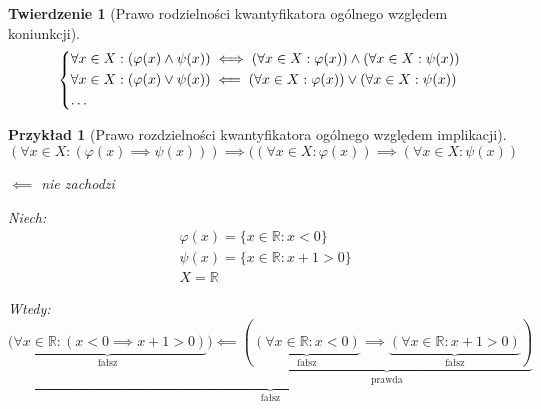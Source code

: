 \documentclass[a5paper,8pt]{article}
\theoremstyle{mythmstyle}
\newtheorem{theorem}{Twierdzenie}[section]
\newtheorem*{example}{Przykład}
\begin{document}
            \begin{theorem}[Prawo rodzielności kwantyfikatora ogólnego względem koniunkcji]

                \[
                    \begin{dcases*}
                    \forall x \in X : (\varphi(x) \wedge \psi(x)) \iff (\forall x \in X : \varphi(x)) \wedge (\forall x \in X : \psi(x)) \\
                    \forall x \in X : (\varphi(x) \vee \psi(x)) \impliedby (\forall x \in X : \varphi(x)) \vee (\forall x \in X : \psi(x)) \\
                    \ldots
                    \end{dcases*}
                \]

            \end{theorem}

            \begin{example}[Prawo rozdzielności kwantyfikatora ogólnego względem implikacji]
                \begin{equation*}
                    (\forall x \in X : ( \varphi(x) \implies \psi(x))) \implies ((\forall x \in X : \varphi(x)) \implies (\forall x \in X : \psi(x))
                \end{equation*}

                \begin{center}
                    $ \impliedby $ nie zachodzi
                \end{center}

                Niech:
                \begin{equation*}
                    \begin{aligned}
                        & \varphi(x) = \{ x \in \mathbb{R} : x < 0 \} \\
                        & \psi(x) = \{ x \in \mathbb{R} : x + 1 > 0 \} \\
                        & X = \mathbb{R}
                    \end{aligned}
                \end{equation*}

                Wtedy:
                \begin{equation*}
                    \underbrace{\underbrace{(\forall x \in \mathbb{R} : (x < 0 \implies x + 1 > 0 )}_{\text{fałsz}})
                    \impliedby \underbrace{(\underbrace{(\forall x \in \mathbb{R} : x < 0)}_{\text{fałsz}} \implies \underbrace{(\forall x \in \mathbb{R} : x + 1 > 0)}_{\text{fałsz}})}_{\text{prawda}}}_{\text{fałsz}}
                \end{equation*}

            \end{example}
\end{document}

